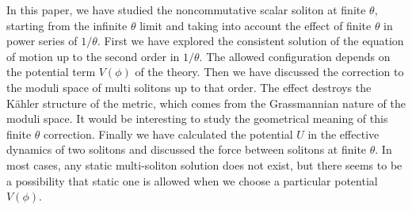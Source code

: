 \documentclass[a4paper,12pt]{article}
\begin{document}
In this paper, we have studied
the noncommutative scalar soliton at finite $\theta$,
starting from the infinite $\theta$ limit and taking into account
the effect of finite $\theta$ 
in power series of $1/\theta$.
First we have explored the consistent solution
of the equation of motion up to the second order in $1/\theta$.
The allowed configuration depends on
the potential term $V(\phi)$ of the theory.
Then we have discussed the correction to the
moduli space of multi solitons up to that order.
The effect destroys the K\"ahler structure of the metric, which comes from
the Grassmannian nature of the moduli space.
It would be interesting to study the geometrical meaning  of
this finite $\theta$ correction.
Finally we have calculated the potential $U$
in the effective dynamics of two solitons
and discussed the force between solitons
at finite $\theta$.
In most cases, any static multi-soliton solution does not exist,
but there seems to be a possibility that static one is allowed
when we choose a particular potential $V(\phi)$.
\end{document}
